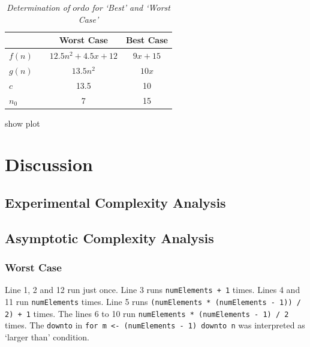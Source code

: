 \documentclass[a4paper,11pt,twoside]{article}
\begin{document}
\begin{table}[]
\caption{\textit{Determination of $ordo$ for `Best' and `Worst Case'}}
\label{tab:ordo}
\begin{tabular}{llcc}
&  & Worst Case & Best Case \\ 
\hline
$f(n)$ &  & \multicolumn{1}{c}{$12.5n^2+4.5x+12$} & \multicolumn{1}{c}{$9x+15$} \\
$g(n)$ &  & \multicolumn{1}{c}{$13.5n^2$}         & \multicolumn{1}{c}{$10x$}   \\
$c$    &  & 13.5                                  & 10                          \\
$n_0$  &  & 7                                     & 15                          \\                         
\end{tabular}
\end{table}

show plot

\section{Discussion}
\subsection{Experimental Complexity Analysis}

\subsection{Asymptotic Complexity Analysis}
\subsubsection{Worst Case}
Line 1, 2 and 12 run just once. Line 3 runs \verb!numElements + 1! times. Lines
4 and 11 run \verb!numElements! times. Line 5 runs
\verb!(numElements * (numElements - 1)) / 2) + 1! 
times. The lines 6 to 10 run \verb!numElements * (numElements - 1) / 2! times. 
The \verb!downto! in \verb!for m <- (numElements - 1) downto n! was
interpreted as `larger than' condition.



\end{document}
